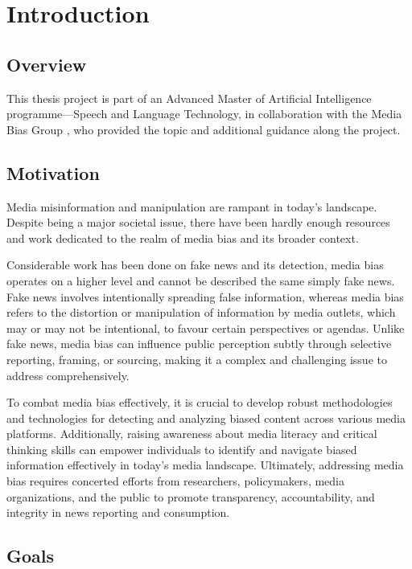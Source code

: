 \chapter{Introduction}
\label{cha:1}

\section{Overview}

This thesis project is part of an Advanced Master of Artificial Intelligence programme—Speech and Language Technology, in collaboration with the Media Bias Group \cite{media-bias-group}, who provided the topic and additional guidance along the project.

\section{Motivation}

Media misinformation and manipulation are rampant in today's landscape. Despite being a major societal issue, there have been hardly enough resources and work dedicated to the realm of media bias and its broader context.

Considerable work has been done on fake news and its detection, media bias operates on a higher level and cannot be described the same simply fake news. Fake news involves intentionally spreading false information, whereas media bias refers to the distortion or manipulation of information by media outlets, which may or may not be intentional, to favour certain perspectives or agendas. Unlike fake news, media bias can influence public perception subtly through selective reporting, framing, or sourcing, making it a complex and challenging issue to address comprehensively.

To combat media bias effectively, it is crucial to develop robust methodologies and technologies for detecting and analyzing biased content across various media platforms. Additionally, raising awareness about media literacy and critical thinking skills can empower individuals to identify and navigate biased information effectively in today's media landscape. Ultimately, addressing media bias requires concerted efforts from researchers, policymakers, media organizations, and the public to promote transparency, accountability, and integrity in news reporting and consumption.

\section{Goals}

